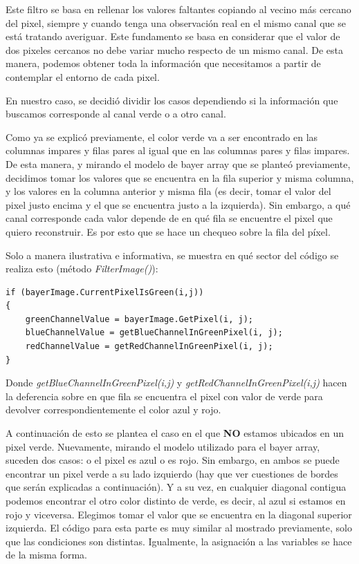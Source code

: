Este filtro se basa en rellenar los valores faltantes copiando al vecino más
cercano del pixel, siempre y cuando tenga una observación real en el mismo canal que se está tratando averiguar. Este fundamento se basa en considerar que el valor de dos pixeles cercanos no debe variar mucho respecto de un mismo canal. De esta manera, podemos obtener toda la información que necesitamos a partir de contemplar el entorno de cada pixel.
\par 
En nuestro caso, se decidió dividir los casos dependiendo si la información que buscamos corresponde al canal verde o a otro canal.
\par 
Como ya se explicó previamente, el color verde va a ser encontrado en las columnas impares y filas pares al igual que en las columnas pares y filas impares. De esta manera, y mirando el modelo de bayer array que se planteó previamente, decidimos tomar los valores que se encuentra en la fila superior y misma columna, y los valores en la columna anterior y misma fila (es decir, tomar el valor del pixel justo encima y el que se encuentra justo a la izquierda). Sin embargo, a qué canal corresponde cada valor depende de en qué fila se encuentre el pixel que quiero reconstruir. Es por esto que se hace un chequeo sobre la fila del píxel.
\par 
Solo a manera ilustrativa e informativa, se muestra en qué sector del código se realiza esto (método \textit{FilterImage()}): 
\begin{lstlisting}
if (bayerImage.CurrentPixelIsGreen(i,j))
{
	greenChannelValue = bayerImage.GetPixel(i, j);
	blueChannelValue = getBlueChannelInGreenPixel(i, j);
	redChannelValue = getRedChannelInGreenPixel(i, j);
}
\end{lstlisting}
\par 
Donde \textit{getBlueChannelInGreenPixel(i,j)} y \textit{getRedChannelInGreenPixel(i,j)} hacen la deferencia sobre en que fila se encuentra el pixel con valor de verde para devolver correspondientemente el color azul y rojo.
\par
A continuación de esto se plantea el caso en el que \textbf{NO} estamos ubicados en un pixel verde. Nuevamente, mirando el modelo utilizado para el bayer array, suceden dos casos: o el pixel es azul o es rojo. Sin embargo, en ambos se puede encontrar un pixel verde a su lado izquierdo (hay que ver cuestiones de bordes que serán explicadas a continuación). Y a su vez, en cualquier diagonal contigua podemos encontrar el otro color distinto de verde, es decir, al azul si estamos en rojo y viceversa. Elegimos tomar el valor que se encuentra en la diagonal superior izquierda. El código para esta parte es muy similar al mostrado previamente, solo que las condiciones son distintas. Igualmente, la asignación a las variables se hace de la misma forma.
